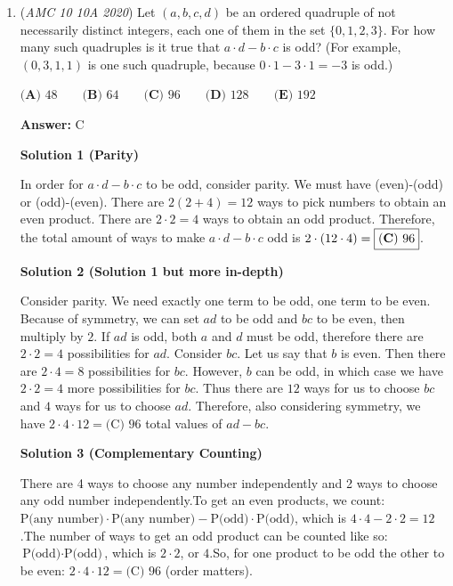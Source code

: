 \begin{enumerate}
 -Walt S.

 


	\item (\textit{AMC 10 10A 2020}) Let $(a,b,c,d)$ be an ordered quadruple of not necessarily distinct integers, each one of them in the set $\{0,1,2,3\}.$ For how many such quadruples is it true that $a\cdot d-b\cdot c$ is odd? (For example, $(0,3,1,1)$ is one such quadruple, because $0\cdot 1-3\cdot 1 = -3$ is odd.)


 $\textbf{(A) } 48 \qquad \textbf{(B) } 64 \qquad \textbf{(C) } 96 \qquad \textbf{(D) } 128 \qquad \textbf{(E) } 192$

 \textbf{Answer: }C



\textbf{Solution 1 (Parity)}

In order for $a\cdot d-b\cdot c$ to be odd, consider parity. We must have (even)-(odd) or (odd)-(even). There are $2(2 + 4) = 12$ ways to pick numbers to obtain an even product. There are $2 \cdot 2 = 4$ ways to obtain an odd product. Therefore, the total amount of ways to make $a\cdot d-b\cdot c$ odd is $2 \cdot (12 \cdot 4) = \boxed{\bold{(C)}\ 96}$.

 



\textbf{Solution 2 (Solution 1 but more in-depth)}

Consider parity. We need exactly one term to be odd, one term to be even. Because of symmetry, we can set $ad$ to be odd and $bc$ to be even, then multiply by $2.$ If $ad$ is odd, both $a$ and $d$ must be odd, therefore there are $2\cdot2=4$ possibilities for $ad.$ Consider $bc.$ Let us say that $b$ is even. Then there are $2\cdot4=8$ possibilities for $bc.$ However, $b$ can be odd, in which case we have $2\cdot2=4$ more possibilities for $bc.$ Thus there are $12$ ways for us to choose $bc$ and $4$ ways for us to choose $ad.$ Therefore, also considering symmetry, we have $2 \cdot 4 \cdot 12= \boxed{ \text{(C) } 96}$ total values of $ad-bc.$




\textbf{Solution 3 (Complementary Counting)}

There are 4 ways to choose any number independently and 2 ways to choose any odd number independently.To get an even products, we count: $\text{P(any number)} \cdot \text{P(any number)}-\text{P(odd)}\cdot\text{P(odd)}$, which is $4 \cdot 4 - 2 \cdot 2=12$.The number of ways to get an odd product can be counted like so: $\text{P(odd)}\cdot\text{P(odd)}$, which is $2 \cdot 2$, or $4$.So, for one product to be odd the other to be even: $2 \cdot 4 \cdot 12= \boxed{ \text{(C) } 96}$ (order matters). 


\end{enumerate}
